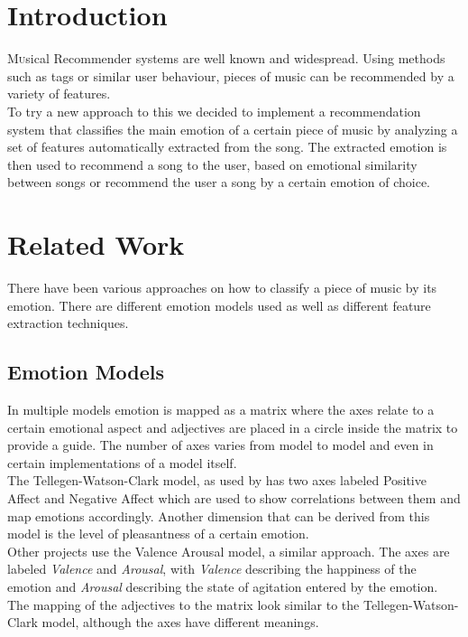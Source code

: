 \begin{multicols}{2} %

\section{Introduction}
\lettrine[nindent=0em, lines=2]{M}usical Recommender systems are well known and widespread. Using methods such as tags or similar user behaviour, pieces of music can be recommended by a variety of features.\\
To try a new approach to this we decided to implement a recommendation system that classifies the main emotion of a certain piece of music by analyzing a set of features automatically extracted from the song. The extracted emotion is then used to recommend a song to the user, based on emotional similarity between songs or recommend the user a song by a certain emotion of choice.

\section{Related Work}
There have been various approaches on how to classify a piece of music by its emotion. There are different emotion models used as well as different feature extraction techniques.

\subsection{Emotion Models}
In multiple models emotion is mapped as a matrix where the axes relate to a certain emotional aspect and adjectives are placed in a circle inside the matrix to provide a guide. The number of axes varies from model to model and even in certain implementations of a model itself.\\
The Tellegen-Watson-Clark model, as used by \citet{Trohidis2011} has two axes labeled Positive Affect and Negative Affect which are used to show correlations between them and map emotions accordingly. Another dimension that can be derived from this model is the level of pleasantness of a certain emotion.\\

Other projects use the Valence Arousal model, a similar approach. The axes are labeled \textit{Valence} and \textit{Arousal}, with \textit{Valence} describing the happiness of the emotion and \textit{Arousal} describing the state of agitation entered by the emotion. The mapping of the adjectives to the matrix look similar to the Tellegen-Watson-Clark model, although the axes have different meanings.


\end{multicols}
